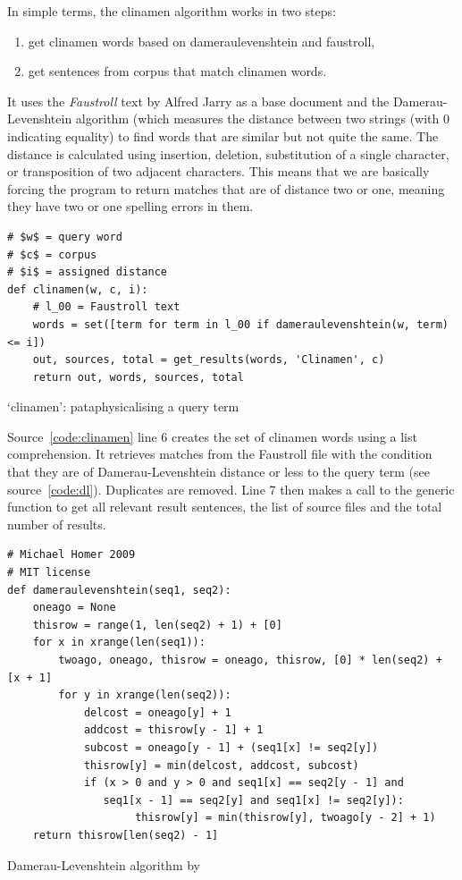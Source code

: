 In simple terms, the clinamen algorithm works in two steps:
\begin{enumerate}
  \item get clinamen words based on dameraulevenshtein and faustroll,
  \item get sentences from corpus that match clinamen words.
\end{enumerate}

It uses the \textit{Faustroll} text by Alfred Jarry \citeyear{Jarry1996} as a base document and the Damerau-Levenshtein algorithm \autocite{Damerau1964, Levenshtein1966} (which measures the distance between two strings (with \num{0} indicating equality) to find words that are similar but not quite the same. The distance is calculated using insertion, deletion, substitution of a single character, or transposition of two adjacent characters. This means that we are basically forcing the program to return matches that are of distance two or one, meaning they have two or one spelling errors in them.

\begin{listing}
  \begin{verbatim}
# $w$ = query word
# $c$ = corpus
# $i$ = assigned distance
def clinamen(w, c, i):
    # l_00 = Faustroll text
    words = set([term for term in l_00 if dameraulevenshtein(w, term) <= i])
    out, sources, total = get_results(words, 'Clinamen', c)
    return out, words, sources, total
  \end{verbatim}
\caption[`clinamen' function]{`clinamen': pataphysicalising a query term}
\label{code:clinamen}
\end{listing}

Source~\ref{code:clinamen} line 6 creates the set of clinamen words using a list comprehension. It retrieves matches from the Faustroll file  with the condition that they are of Damerau-Levenshtein distance  or less to the query term  (see source~\ref{code:dl}). Duplicates are removed. Line 7 then makes a call to the generic  function to get all relevant result sentences, the list of source files and the total number of results.

\begin{listing}
  \begin{verbatim}
# Michael Homer 2009
# MIT license
def dameraulevenshtein(seq1, seq2):
    oneago = None
    thisrow = range(1, len(seq2) + 1) + [0]
    for x in xrange(len(seq1)):
        twoago, oneago, thisrow = oneago, thisrow, [0] * len(seq2) + [x + 1]
        for y in xrange(len(seq2)):
            delcost = oneago[y] + 1
            addcost = thisrow[y - 1] + 1
            subcost = oneago[y - 1] + (seq1[x] != seq2[y])
            thisrow[y] = min(delcost, addcost, subcost)
            if (x > 0 and y > 0 and seq1[x] == seq2[y - 1] and
               seq1[x - 1] == seq2[y] and seq1[x] != seq2[y]):
                    thisrow[y] = min(thisrow[y], twoago[y - 2] + 1)
    return thisrow[len(seq2) - 1]
  \end{verbatim}
\caption[`dameraulevenshtein' function]{Damerau-Levenshtein algorithm by \autocite{Homer2009}}
\label{code:dl}
\end{listing}


